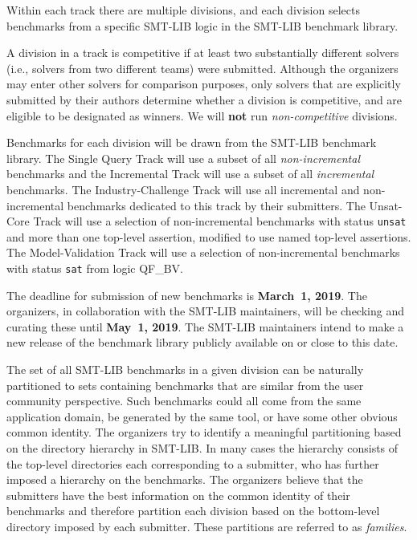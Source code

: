 \documentclass[12pt]{article}
\newcommand{\maintrack}{Single Query Track\xspace}
\newcommand{\inctrack}{Incremental Track\xspace}
\newcommand{\ucoretrack}{Unsat-Core Track\xspace}
\newcommand{\mvaltrack}{Model-Validation Track\xspace}
\newcommand{\challtrack}{Industry-Challenge Track\xspace}
\begin{document}
Within each track there are multiple divisions, and each division selects
benchmarks from a specific SMT-LIB logic in the SMT-LIB benchmark library.

A division in a track is competitive if at least two substantially
different solvers (i.e., solvers from two different teams) were
submitted.  Although the organizers may enter other solvers for
comparison purposes, only solvers that are explicitly submitted by
their authors determine whether a division is competitive, and are
eligible to be designated as winners.
We will \textbf{not} run \emph{non-competitive} divisions.

Benchmarks for each division will be drawn from the SMT-LIB benchmark library.
The \maintrack will use a subset of all \emph{non-incremental} benchmarks and
the \inctrack will use a subset of all \emph{incremental} benchmarks. The
\challtrack will use all incremental and non-incremental benchmarks dedicated
to this track by their submitters. The \ucoretrack will use a selection of
non-incremental benchmarks with status \texttt{unsat} and more than one
top-level assertion, modified to use named top-level assertions.  The
\mvaltrack will use a selection of non-incremental benchmarks with status
\texttt{sat} from logic QF\_BV.

The deadline for submission of new benchmarks is {\bf March~1, 2019}.
The organizers, in collaboration with the SMT-LIB maintainers, will be
checking and curating these until {\bf May~1, 2019}.  The SMT-LIB
maintainers intend to make a new release of the benchmark library
publicly available on or close to this date.

The set of all SMT-LIB benchmarks in a given division can be naturally
partitioned to sets containing benchmarks that are similar from the user
community perspective.  Such benchmarks could all come from the same
application domain, be generated by the same tool, or have some other
obvious common identity.
%
The organizers try to identify a meaningful partitioning based on the
directory hierarchy in SMT-LIB.  In many cases the hierarchy consists of
the top-level directories each corresponding to a submitter, who has
further imposed a hierarchy on the benchmarks.
%
The organizers believe that the submitters have the best information on
the common identity of their benchmarks and therefore partition each
division based on the bottom-level directory imposed by each submitter.
These partitions are referred to as \emph{families}.
\end{document}
